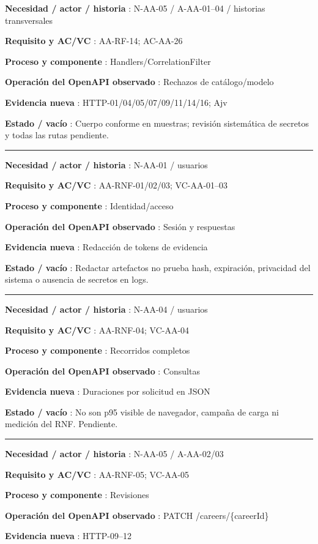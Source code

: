 \documentclass[11pt,a4paper]{article}
\begin{document}
\textbf{Necesidad / actor / historia }: N-AA-05 / A-AA-01--04 /
historias transversales

\textbf{Requisito y AC/VC }: AA-RF-14; AC-AA-26

\textbf{Proceso y componente }: Handlers/CorrelationFilter

\textbf{Operación del OpenAPI observado }: Rechazos de catálogo/modelo

\textbf{Evidencia nueva }: HTTP-01/04/05/07/09/11/14/16; Ajv

\textbf{Estado / vacío }: Cuerpo conforme en muestras; revisión
sistemática de secretos y todas las rutas pendiente.

\medskip\hrule\medskip

\textbf{Necesidad / actor / historia }: N-AA-01 / usuarios

\textbf{Requisito y AC/VC }: AA-RNF-01/02/03; VC-AA-01--03

\textbf{Proceso y componente }: Identidad/acceso

\textbf{Operación del OpenAPI observado }: Sesión y respuestas

\textbf{Evidencia nueva }: Redacción de tokens de evidencia

\textbf{Estado / vacío }: Redactar artefactos no prueba hash,
expiración, privacidad del sistema o ausencia de secretos en logs.

\medskip\hrule\medskip

\textbf{Necesidad / actor / historia }: N-AA-04 / usuarios

\textbf{Requisito y AC/VC }: AA-RNF-04; VC-AA-04

\textbf{Proceso y componente }: Recorridos completos

\textbf{Operación del OpenAPI observado }: Consultas

\textbf{Evidencia nueva }: Duraciones por solicitud en JSON

\textbf{Estado / vacío }: No son p95 visible de navegador, campaña de
carga ni medición del RNF. Pendiente.

\medskip\hrule\medskip

\textbf{Necesidad / actor / historia }: N-AA-05 / A-AA-02/03

\textbf{Requisito y AC/VC }: AA-RNF-05; VC-AA-05

\textbf{Proceso y componente }: Revisiones

\textbf{Operación del OpenAPI observado }: PATCH /careers/\{careerId\}

\textbf{Evidencia nueva }: HTTP-09--12
\end{document}
